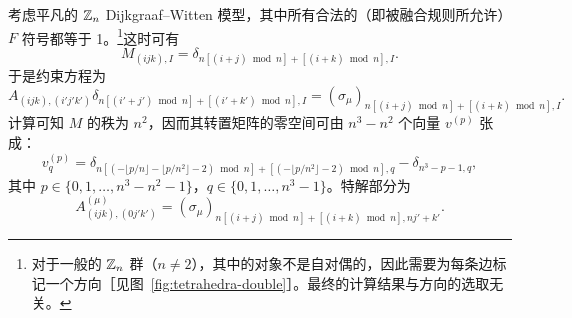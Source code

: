 考虑平凡的 $\mathbb{Z}_n$ Dijkgraaf--Witten 模型，其中所有合法的（即被融合规则所允许）$F$ 符号都等于 1。\footnote{对于一般的 $\mathbb{Z}_n$ 群（$n\neq2$），其中的对象不是自对偶的，因此需要为每条边标记一个方向［见图~\ref{fig:tetrahedra-double}］。最终的计算结果与方向的选取无关。}这时可有
\begin{equation}
  M_{(ijk), I} = \delta_{n[(i+j)\bmod n]+[(i+k)\bmod n], I}.
\end{equation}
于是约束方程为
\begin{equation}
    A_{(ijk), (i'j'k')} \delta_{n[(i'+j')\bmod n]+[(i'+k')\bmod n], I}
  = (\sigma_\mu)_{n[(i+j)\bmod n]+[(i+k)\bmod n], I}.
\end{equation}
计算可知 $M$ 的秩为 $n^2$，因而其转置矩阵的零空间可由 $n^3-n^2$ 个向量 $v^{(p)}$ 张成：
\begin{equation}
  v^{(p)}_q = \delta_{n [(- \lfloor p/n\rfloor - \lfloor p/n^2 \rfloor - 2) \bmod n] + [(- \lfloor p/n^2 \rfloor - 2) \bmod n], q}
  - \delta_{n^3-p-1, q},
\end{equation}
其中 $p\in\{0,1,\dots,n^3-n^2-1\}$，$q\in\{0,1,\dots,n^3-1\}$。特解部分为
\begin{equation}
  A^{(\mu)}_{(ijk), (0j'k')} = (\sigma_\mu)_{n[(i+j)\bmod n]+[(i+k)\bmod n], nj'+k'}.
\end{equation}


